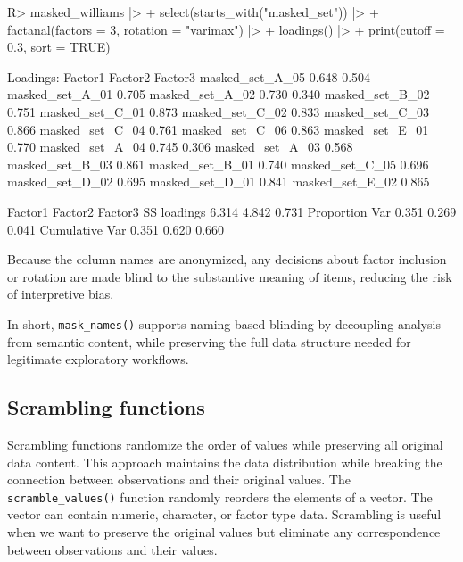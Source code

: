 \documentclass[
]{jss}
\begin{document}
\begin{CodeChunk}
\begin{CodeInput}
R> masked_williams |> 
+   select(starts_with("masked_set")) |> 
+   factanal(factors = 3, rotation = "varimax") |> 
+   loadings() |> 
+   print(cutoff = 0.3, sort = TRUE)
\end{CodeInput}
\begin{CodeOutput}

Loadings:
                Factor1 Factor2 Factor3
masked_set_A_05  0.648           0.504 
masked_set_A_01  0.705                 
masked_set_A_02  0.730           0.340 
masked_set_B_02  0.751                 
masked_set_C_01  0.873                 
masked_set_C_02  0.833                 
masked_set_C_03  0.866                 
masked_set_C_04  0.761                 
masked_set_C_06  0.863                 
masked_set_E_01  0.770                 
masked_set_A_04          0.745   0.306 
masked_set_A_03          0.568         
masked_set_B_03          0.861         
masked_set_B_01          0.740         
masked_set_C_05          0.696         
masked_set_D_02          0.695         
masked_set_D_01          0.841         
masked_set_E_02          0.865         

               Factor1 Factor2 Factor3
SS loadings      6.314   4.842   0.731
Proportion Var   0.351   0.269   0.041
Cumulative Var   0.351   0.620   0.660
\end{CodeOutput}
\end{CodeChunk}

Because the column names are anonymized, any decisions about factor
inclusion or rotation are made blind to the substantive meaning of
items, reducing the risk of interpretive bias.

In short, \texttt{mask\_names()} supports naming-based blinding by
decoupling analysis from semantic content, while preserving the full
data structure needed for legitimate exploratory workflows.

\subsection{Scrambling functions}\label{scrambling-functions}

Scrambling functions randomize the order of values while preserving all
original data content. This approach maintains the data distribution
while breaking the connection between observations and their original
values. The \texttt{scramble\_values()} function randomly reorders the
elements of a vector. The vector can contain numeric, character, or
factor type data. Scrambling is useful when we want to preserve the
original values but eliminate any correspondence between observations
and their values.
\end{document}
